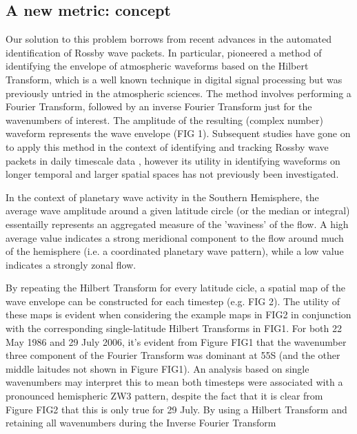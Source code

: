 \subsection{A new metric: concept}

Our solution to this problem borrows from recent advances in the automated identification of Rossby wave packets. In particular, \citet{Zimin2003} pioneered a method of identifying the envelope of atmospheric waveforms based on the Hilbert Transform, which is a well known technique in digital signal processing but was previously untried in the atmospheric sciences. The method involves performing a Fourier Transform, followed by an inverse Fourier Transform just for the wavenumbers of interest. The amplitude of the resulting (complex number) waveform represents the wave envelope (FIG 1). Subsequent studies have gone on to apply this method in the context of identifying and tracking Rossby wave packets in daily timescale data \citep{Glatt2014,Souders2014a}, however its utility in identifying waveforms on longer temporal and larger spatial spaces has not previously been investigated.

In the context of planetary wave activity in the Southern Hemisphere, the average wave amplitude around a given latitude circle (or the median or integral) essentailly represents an aggregated measure of the 'waviness' of the flow. A high average value indicates a strong meridional component to the flow around much of the hemisphere (i.e. a coordinated planetary wave pattern), while a low value indicates a strongly zonal flow. 

By repeating the Hilbert Transform for every latitude cicle, a spatial map of the wave envelope can be constructed for each timestep (e.g. FIG 2). The utility of these maps is evident when considering the example maps in FIG2 in conjunction with the corresponding single-latitude Hilbert Transforms in FIG1. For both 22 May 1986 and 29 July 2006, it's evident from Figure FIG1 that the wavenumber three component of the Fourier Transform was dominant at 55S (and the other middle laitudes not shown in Figure FIG1). An analysis based on single wavenumbers may interpret this to mean both timesteps were associated with a pronounced hemispheric ZW3 pattern, despite the fact that it is clear from Figure FIG2 that this is only true for 29 July. By using a Hilbert Transform and retaining all wavenumbers during the Inverse Fourier Transform
